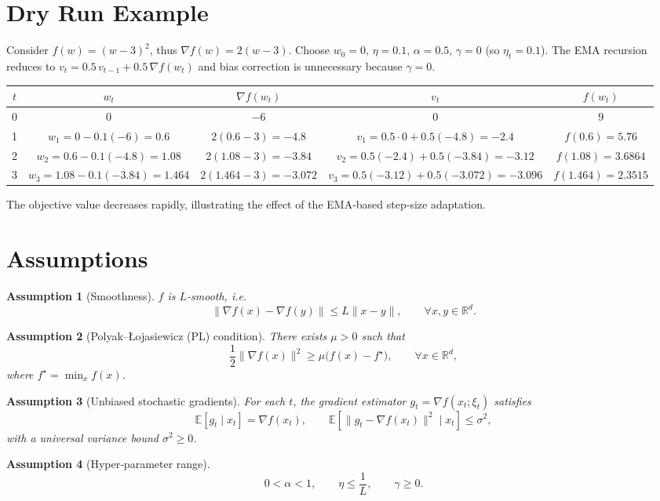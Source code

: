 \documentclass{article}
\newtheorem{assumption}{Assumption}
\newcommand{\E}{\mathbb{E}}
\newcommand{\R}{\mathbb{R}}
\begin{document}
\section*{Dry Run Example}
Consider $f(w)=(w-3)^{2}$, thus $\nabla f(w)=2(w-3)$.  
Choose $w_{0}=0$, $\eta=0.1$, $\alpha=0.5$, $\gamma=0$ (so $\eta_{t}=0.1$).  
The EMA recursion reduces to $v_{t}=0.5\,v_{t-1}+0.5\,\nabla f(w_{t})$ and bias correction is unnecessary because $\gamma=0$.

\begin{center}
\begin{tabular}{c|c|c|c|c}
$t$ & $w_{t}$ & $\nabla f(w_{t})$ & $v_{t}$ & $f(w_{t})$\\ \hline
0 & $0$ & $-6$ & $0$ & $9$\\ \hline
1 & $w_{1}=0-0.1(-6)=0.6$ &
   $2(0.6-3)=-4.8$ &
   $v_{1}=0.5\cdot0+0.5(-4.8)=-2.4$ &
   $f(0.6)=5.76$\\ \hline
2 & $w_{2}=0.6-0.1(-4.8)=1.08$ &
   $2(1.08-3)=-3.84$ &
   $v_{2}=0.5(-2.4)+0.5(-3.84)=-3.12$ &
   $f(1.08)=3.6864$\\ \hline
3 & $w_{3}=1.08-0.1(-3.84)=1.464$ &
   $2(1.464-3)=-3.072$ &
   $v_{3}=0.5(-3.12)+0.5(-3.072)=-3.096$ &
   $f(1.464)=2.3515$\\
\end{tabular}
\end{center}
The objective value decreases rapidly, illustrating the effect of the EMA‑based step‑size adaptation.

\newpage
\section*{Assumptions}
\begin{assumption}[Smoothness]\label{ass:smooth}
$f$ is $L$‑smooth, i.e.
\[
    \|\nabla f(x)-\nabla f(y)\|\le L\|x-y\|,\qquad\forall x,y\in\R^{d}.
\]
\end{assumption}
\begin{assumption}[Polyak–Łojasiewicz (PL) condition]\label{ass:pl}
There exists $\mu>0$ such that
\[
    \frac12\|\nabla f(x)\|^{2}\ge\mu\bigl(f(x)-f^{\star}\bigr),\qquad\forall x\in\R^{d},
\]
where $f^{\star}= \min_{x}f(x)$.
\end{assumption}
\begin{assumption}[Unbiased stochastic gradients]\label{ass:unbiased}
For each $t$, the gradient estimator $g_{t}=\nabla f(x_{t};\xi_{t})$ satisfies
\[
    \E\!\left[g_{t}\mid x_{t}\right]=\nabla f(x_{t}),\qquad
    \E\!\left[\|g_{t}-\nabla f(x_{t})\|^{2}\mid x_{t}\right]\le\sigma^{2},
\]
with a universal variance bound $\sigma^{2}\ge0$.
\end{assumption}
\begin{assumption}[Hyper‑parameter range]\label{ass:param}
\[
    0<\alpha<1,\qquad \eta\le\frac{1}{L},\qquad \gamma\ge0.
\]
\end{assumption}
\end{document}
